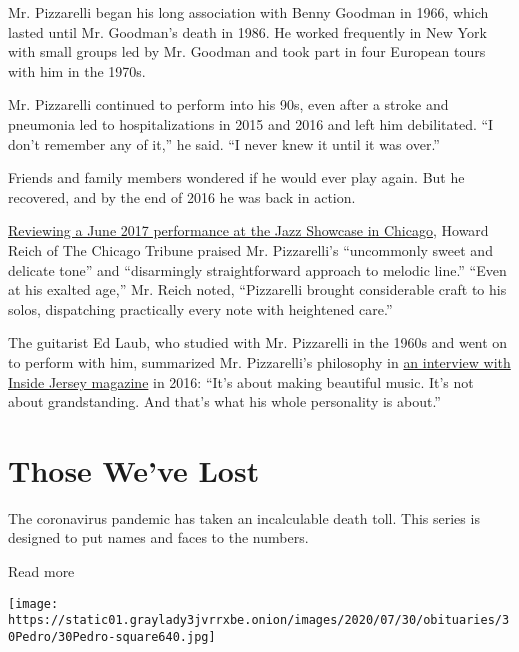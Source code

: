 Mr. Pizzarelli began his long association with Benny Goodman in 1966,
which lasted until Mr. Goodman's death in 1986. He worked frequently in
New York with small groups led by Mr. Goodman and took part in four
European tours with him in the 1970s.

Mr. Pizzarelli continued to perform into his 90s, even after a stroke
and pneumonia led to hospitalizations in 2015 and 2016 and left him
debilitated. ``I don't remember any of it,'' he said. ``I never knew it
until it was over.''

Friends and family members wondered if he would ever play again. But he
recovered, and by the end of 2016 he was back in action.

\href{http://www.chicagotribune.com/entertainment/music/reich/ct-ent-0624-bucky-pizzarelli-20170623-column.html}{Reviewing
a June 2017 performance at the Jazz Showcase in Chicago}, Howard Reich
of The Chicago Tribune praised Mr. Pizzarelli's ``uncommonly sweet and
delicate tone'' and ``disarmingly straightforward approach to melodic
line.'' ``Even at his exalted age,'' Mr. Reich noted, ``Pizzarelli
brought considerable craft to his solos, dispatching practically every
note with heightened care.''

The guitarist Ed Laub, who studied with Mr. Pizzarelli in the 1960s and
went on to perform with him, summarized Mr. Pizzarelli's philosophy in
\href{https://www.nj.com/inside-jersey/index.ssf/2016/12/nj_guitar_master_bucky_pizzarelli_turns_back_time_as_he_plays_on.html}{an
interview with Inside Jersey magazine} in 2016: ``It's about making
beautiful music. It's not about grandstanding. And that's what his whole
personality is about.''

\href{https://www.nytimes3xbfgragh.onion/interactive/2020/obituaries/people-died-coronavirus-obituaries.html?action=click\&pgtype=Article\&state=default\&region=BELOW_MAIN_CONTENT\&context=covid_obits_promo}{}

\hypertarget{those-weve-lost}{%
\section{Those We've Lost}\label{those-weve-lost}}

The coronavirus pandemic has taken an incalculable death toll. This
series is designed to put names and faces to the numbers.

Read more

\texttt{[image: https://static01.graylady3jvrrxbe.onion/images/2020/07/30/obituaries/30Pedro/30Pedro-square640.jpg]}

